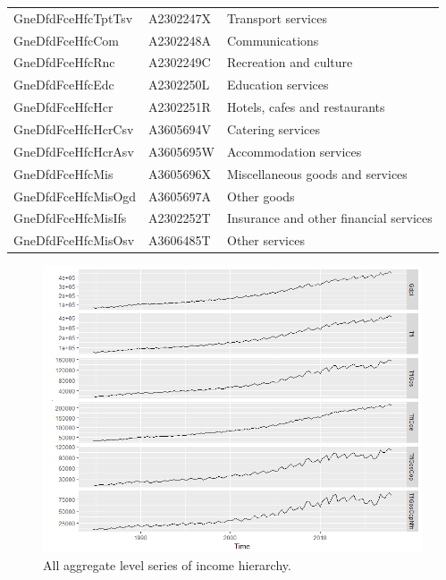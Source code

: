 \documentclass[graybox]{svmult}
\begin{document}
\begin{table}[H]
{\begin{tabular}[t]{lll}
			\addlinespace
			GneDfdFceHfcTptTsv & A2302247X & Transport services\\
			GneDfdFceHfcCom & A2302248A & Communications\\
			GneDfdFceHfcRnc & A2302249C & Recreation and culture\\
			GneDfdFceHfcEdc & A2302250L & Education services\\
			GneDfdFceHfcHcr & A2302251R & Hotels, cafes and restaurants\\
			\addlinespace
			GneDfdFceHfcHcrCsv & A3605694V & Catering services\\
			GneDfdFceHfcHcrAsv & A3605695W & Accommodation services\\
			GneDfdFceHfcMis & A3605696X & Miscellaneous goods and services\\
			GneDfdFceHfcMisOgd & A3605697A & Other goods\\
			GneDfdFceHfcMisIfs & A2302252T & Insurance and other financial services\\
			GneDfdFceHfcMisOsv & A3606485T & Other services\\
			\bottomrule
		\end{tabular}
		\label{Tab:Expenditure-hierarchy-3}
	}
\end{table}

\begin{figure}[H]
	\centering
	\small
	\includegraphics[scale=0.5]{Figs/TS-plots/INC-hierarchy/INC-aggregates_TSplots.png}
	\caption{All aggregate level series of income hierarchy.}\label{INC-aggregates_TSplot}
\end{figure}
\end{document}
